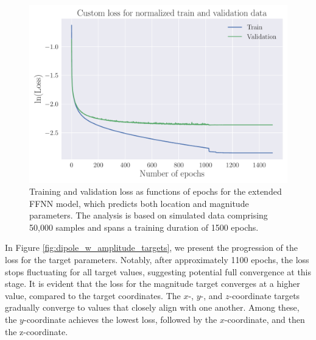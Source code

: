 \documentclass[a4paper, UKenglish, 11pt]{uiomaster}
\begin{document}
\begin{figure}[!htb]
    \centering
    \includegraphics[width=\linewidth]{figures/NN_magnitude/Custom_Loss_amplitudes_test_custom_loss_tanh_32_0.001_0.35_0.1_0_1500_(0).pdf}
    \caption{Training and validation loss as functions of epochs for the extended FFNN model, which predicts both location and magnitude parameters. The analysis is based on simulated data comprising 50,000 samples and spans a training duration of 1500 epochs.}
    \label{fig:dipole_w_amplitude_loss}
\end{figure}

In Figure \ref{fig:dipole_w_amplitude_targets}, we present the progression of the loss for the target parameters. Notably, after approximately 1100 epochs, the loss stops fluctuating for all target values, suggesting potential full convergence at this stage. It is evident that the loss for the magnitude target converges at a higher value, compared to the target coordinates. The $x$-, $y$-, and $z$-coordinate targets gradually converge to values that closely align with one another. Among these, the $y$-coordinate achieves the lowest loss, followed by the $x$-coordinate, and then the z-coordinate.
\end{document}
